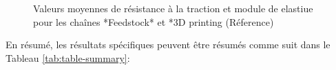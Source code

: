 \documentclass[
]{article}
\begin{document}
\begin{figure}

{\centering {}

}

\caption{Valeurs moyennes de résistance à la traction et module de elastiue pour les chaînes *Feedstock* et *3D printing (Réference)}\label{fig:Feed-3DP}
\end{figure}

En résumé, les résultats spécifiques peuvent être résumés comme suit dans le Tableau \ref{tab:table-summary}:

\providecommand{\docline}[3]{\noalign{\global\setlength{\arrayrulewidth}{#1}}\arrayrulecolor[HTML]{#2}\cline{#3}}

\setlength{\tabcolsep}{2pt}

\renewcommand*{\arraystretch}{1.5}
\end{document}
